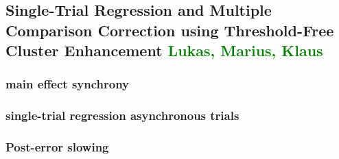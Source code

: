 \subsection{Single-Trial Regression and Multiple Comparison Correction using Threshold-Free Cluster Enhancement \textcolor{green}{Lukas, Marius, Klaus}}

\subsubsection{main effect synchrony}

\subsubsection{single-trial regression asynchronous trials}

\subsubsection{Post-error slowing}
